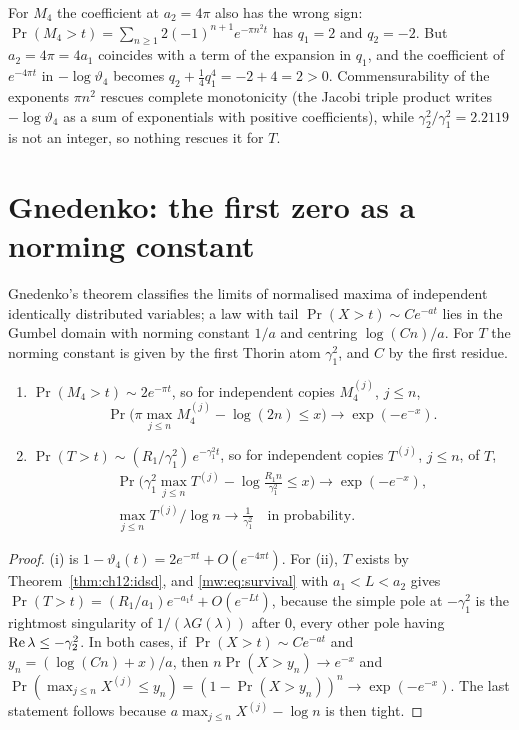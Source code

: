 For $M_4$ the coefficient at $a_2=4\pi$ also has the wrong sign: $\Pr(M_4>t)=\sum_{n\ge1}2(-1)^{n+1}e^{-\pi n^2t}$ has $q_1=2$ and $q_2=-2$. But $a_2=4\pi=4a_1$ coincides with a term of the expansion in $q_1$, and the coefficient of $e^{-4\pi t}$ in $-\log\vartheta_4$ becomes $q_2+\frac14q_1^4=-2+4=2>0$. Commensurability of the exponents $\pi n^2$ rescues complete monotonicity (the Jacobi triple product writes $-\log\vartheta_4$ as a sum of exponentials with positive coefficients), while $\gamma_2^2/\gamma_1^2=2.2119$ is not an integer, so nothing rescues it for $T$.

\section{Gnedenko: the first zero as a norming constant}\label{mw:sec:gnedenko}

Gnedenko's theorem \cite{Gnedenko43} classifies the limits of normalised maxima of independent identically distributed variables; a law with tail $\Pr(X>t)\sim Ce^{-at}$ lies in the Gumbel domain with norming constant $1/a$ and centring $\log(Cn)/a$. For $T$ the norming constant is given by the first Thorin atom $\gamma_1^2$, and $C$ by the first residue.

\begin{proposition}\label{mw:prop:gnedenko}
\begin{enumerate}
\item[(i)] $\Pr(M_4>t)\sim2e^{-\pi t}$, so for independent copies $M_4^{(j)}$, $j\le n$,
\[
\Pr\big(\pi\max_{j\le n}M_4^{(j)}-\log(2n)\le x\big)\to\exp(-e^{-x}).
\]
\item[(ii)] $\Pr(T>t)\sim(R_1/\gamma_1^2)\,e^{-\gamma_1^2t}$, so for independent copies $T^{(j)}$, $j\le n$, of $T$,
\begin{gather*}
\Pr\Big(\gamma_1^2\max_{j\le n}T^{(j)}-\log\frac{R_1n}{\gamma_1^2}\le x\Big)\to\exp(-e^{-x}),\\
\max_{j\le n}T^{(j)}\Big/\log n\to\frac1{\gamma_1^2}\quad\text{in probability.}
\end{gather*}
\end{enumerate}
\end{proposition}

\begin{proof}
(i) is $1-\vartheta_4(t)=2e^{-\pi t}+O(e^{-4\pi t})$. For (ii), $T$ exists by Theorem~\ref{thm:ch12:idsd}, and \eqref{mw:eq:survival} with $a_1<L<a_2$ gives $\Pr(T>t)=(R_1/a_1)e^{-a_1t}+O(e^{-Lt})$, because the simple pole at $-\gamma_1^2$ is the rightmost singularity of $1/(\lambda G(\lambda))$ after $0$, every other pole having $\operatorname{Re}\lambda\le-\gamma_2^2$. In both cases, if $\Pr(X>t)\sim Ce^{-at}$ and $y_n=(\log(Cn)+x)/a$, then $n\Pr(X>y_n)\to e^{-x}$ and $\Pr(\max_{j\le n}X^{(j)}\le y_n)=(1-\Pr(X>y_n))^n\to\exp(-e^{-x})$. The last statement follows because $a\max_{j\le n}X^{(j)}-\log n$ is then tight.
\end{proof}

